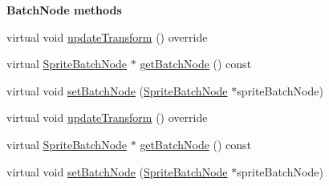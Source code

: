 \begin{Indent}\textbf{ Batch\+Node methods}\par
\begin{DoxyCompactItemize}
\item 
virtual void \hyperlink{classSprite_a6b64d23ba646325021c2a5118dc5163d}{update\+Transform} () override
\item 
virtual \hyperlink{classSpriteBatchNode}{Sprite\+Batch\+Node} $\ast$ \hyperlink{classSprite_a1eb6a1e8196f526077a4435fee295e53}{get\+Batch\+Node} () const
\item 
virtual void \hyperlink{classSprite_a891c5d485efcc3a599236118d4434d87}{set\+Batch\+Node} (\hyperlink{classSpriteBatchNode}{Sprite\+Batch\+Node} $\ast$sprite\+Batch\+Node)
\item 
virtual void \hyperlink{classSprite_aa486a133eeb98d0872f4a71e5926aeeb}{update\+Transform} () override
\item 
virtual \hyperlink{classSpriteBatchNode}{Sprite\+Batch\+Node} $\ast$ \hyperlink{classSprite_a5fde60267e49045cb867de2acae92ddf}{get\+Batch\+Node} () const
\item 
virtual void \hyperlink{classSprite_a8faffa895d0a302e86a8bcbf406df890}{set\+Batch\+Node} (\hyperlink{classSpriteBatchNode}{Sprite\+Batch\+Node} $\ast$sprite\+Batch\+Node)
\end{DoxyCompactItemize}
\end{Indent}

